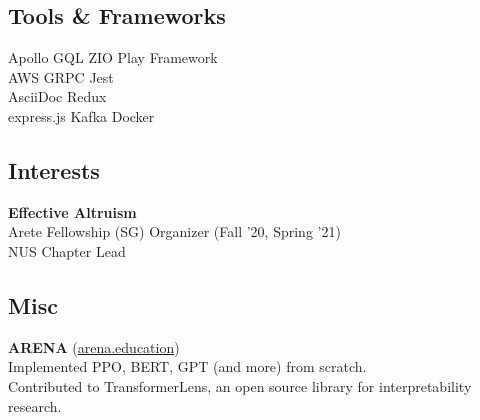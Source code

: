 \documentclass[]{deedy-resume-openfont}
\begin{document}
\begin{minipage}[t]{0.29\textwidth}
\subsection{Tools \& Frameworks}
Apollo GQL \textbullet{} ZIO \textbullet{} Play Framework \\ AWS \textbullet{} GRPC \textbullet{} Jest \\ AsciiDoc \textbullet{} Redux \\ express.js \textbullet{} Kafka \textbullet{} Docker
\sectionsep

\subsection{Interests}
\textbf{Effective Altruism} \\
Arete Fellowship (SG) Organizer (Fall '20, Spring '21)\\
NUS Chapter Lead\\
\sectionsep

\subsection{Misc}
\textbf{ARENA} (\href{https://www.arena.education/}{arena.education})\\
\textbullet{} Implemented PPO, BERT, GPT (and more) from scratch. \\
\textbullet{} Contributed to TransformerLens, an open source library for interpretability research.

%
%

\end{minipage} 
\hfill
\end{document}
